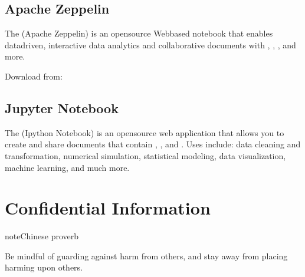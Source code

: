 \documentclass[letterpaper,12pt,english]{sphinxmanual}
\begin{document}
\section{Apache Zeppelin}
\label{\detokenize{nb:apache-zeppelin}}
\sphinxAtStartPar
The  (Apache Zeppelin) is an open\sphinxhyphen{}source Web\sphinxhyphen{}based notebook that enables
data\sphinxhyphen{}driven, interactive data analytics and collaborative documents with ,
, ,  and more.

\sphinxAtStartPar
Download from: 

\begin{figure}[htbp]
\centering

\noindent{}
\end{figure}


\section{Jupyter Notebook}
\label{\detokenize{nb:jupyter-notebook}}
\sphinxAtStartPar
The  (Ipython Notebook) is an open\sphinxhyphen{}source web application that allows you
to create and share documents that contain , ,
 and . Uses include: data cleaning and
transformation, numerical simulation, statistical modeling, data visualization,
machine learning, and much more.

\begin{figure}[htbp]
\centering

\noindent{}
\end{figure}


\chapter{Confidential Information}
\label{\detokenize{confi:confidential-information}}\label{\detokenize{confi:confi}}\label{\detokenize{confi::doc}}
\begin{sphinxadmonition}{note}{Chinese proverb}

\sphinxAtStartPar
Be mindful of guarding against harm from others, and stay away from placing harming upon others.
\end{sphinxadmonition}
\end{document}
